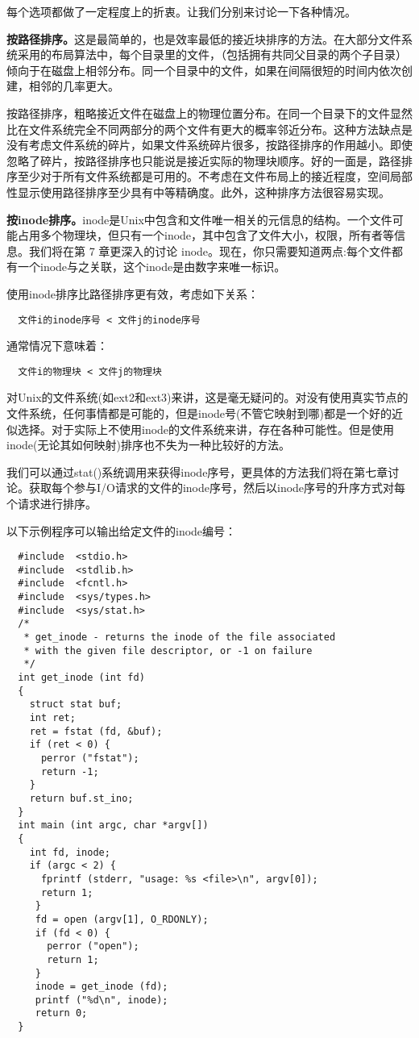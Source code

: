 每个选项都做了一定程度上的折衷。让我们分别来讨论一下各种情况。

\textbf{按路径排序。}这是最简单的，也是效率最低的接近块排序的方法。在大部分文件系统采用的布局算法中，每个目录里的文件，（包括拥有共同父目录的两个子目录）倾向于在磁盘上相邻分布。同一个目录中的文件，如果在间隔很短的时间内依次创建，相邻的几率更大。
  
按路径排序，粗略接近文件在磁盘上的物理位置分布。在同一个目录下的文件显然比在文件系统完全不同两部分的两个文件有更大的概率邻近分布。这种方法缺点是没有考虑文件系统的碎片，如果文件系统碎片很多，按路径排序的作用越小。即使忽略了碎片，按路径排序也只能说是接近实际的物理块顺序。好的一面是，路径排序至少对于所有文件系统都是可用的。不考虑在文件布局上的接近程度，空间局部性显示使用路径排序至少具有中等精确度。此外，这种排序方法很容易实现。

\textbf{按inode排序。}inode是Unix中包含和文件唯一相关的元信息的结构。一个文件可能占用多个物理块，但只有一个inode，其中包含了文件大小，权限，所有者等信息。我们将在第 7 章更深入的讨论 inode。现在，你只需要知道两点:每个文件都有一个inode与之关联，这个inode是由数字来唯一标识。

使用inode排序比路径排序更有效，考虑如下关系：

\begin{verbatim}
  文件i的inode序号 < 文件j的inode序号
\end{verbatim}

通常情况下意味着：

\begin{verbatim}
  文件i的物理块 < 文件j的物理块
\end{verbatim}

对Unix的文件系统(如ext2和ext3)来讲，这是毫无疑问的。对没有使用真实节点的文件系统，任何事情都是可能的，但是inode号(不管它映射到哪)都是一个好的近似选择。对于实际上不使用inode的文件系统来讲，存在各种可能性。但是使用inode(无论其如何映射)排序也不失为一种比较好的方法。

我们可以通过stat()系统调用来获得inode序号，更具体的方法我们将在第七章讨论。获取每个参与I/O请求的文件的inode序号，然后以inode序号的升序方式对每个请求进行排序。

以下示例程序可以输出给定文件的inode编号：

\begin{lstlisting}
  #include  <stdio.h>
  #include  <stdlib.h>
  #include  <fcntl.h>
  #include  <sys/types.h>
  #include  <sys/stat.h>
  /*
   * get_inode - returns the inode of the file associated
   * with the given file descriptor, or -1 on failure
   */
  int get_inode (int fd)
  {
    struct stat buf;
    int ret;
    ret = fstat (fd, &buf);
    if (ret < 0) {
      perror ("fstat");
      return -1;
    }
    return buf.st_ino;
  }
  int main (int argc, char *argv[])
  {
    int fd, inode;
    if (argc < 2) {
      fprintf (stderr, "usage: %s <file>\n", argv[0]);
      return 1;
     }
     fd = open (argv[1], O_RDONLY);
     if (fd < 0) {
       perror ("open");
       return 1;
     }
     inode = get_inode (fd);
     printf ("%d\n", inode);
     return 0;
  }
 \end{lstlisting}

